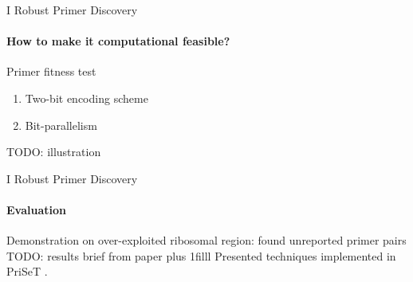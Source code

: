 \documentclass[xcolor=dvipsnames,envcountsect]{beamer}
\begin{document}
\begin{frame}{I Robust Primer Discovery}
\framesubtitle{How to make it computational feasible?}
Primer fitness test
\begin{enumerate}
    \item Two-bit encoding scheme 
    \item Bit-parallelism
\end{enumerate}
    TODO: illustration

\end{frame}

\begin{frame}{I Robust Primer Discovery}
\framesubtitle{Evaluation}
Demonstration on over-exploited ribosomal region: found unreported primer pairs \cite{PriSeT2021}
TODO: results brief from paper
\vskip0pt plus 1filll
Presented techniques implemented in PriSeT \cite{PriSeTGitHub}.
\end{frame}
\end{document}
